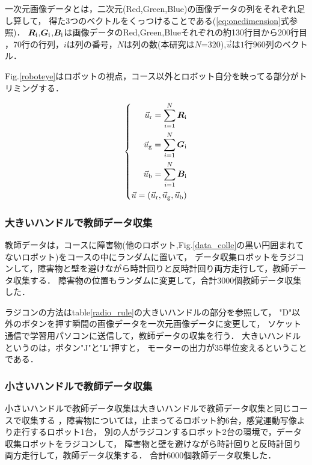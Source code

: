 
一次元画像データとは，二次元(Red,Green,Blue)の画像データの列をそれぞれ足し算して，
得た3つのベクトルをくっつけることである(\ref{eq:onedimension}式参照)．
$\boldsymbol R_{\rm i}$,$\boldsymbol G_{\rm i}$,$\boldsymbol B_{\rm i}$は画像データのRed,Green,Blueそれぞれの約130行目から200行目
，70行の行列，$i$は列の番号，$N$は列の数(本研究は$N$=320),$\vec u$は$1$行$960$列のベクトル．

Fig.\ref{roboteye}はロボットの視点，コース以外とロボット自分を映ってる部分がトリミングする．

\vspace{-2mm}
\begin{eqnarray}
\left\{
\begin{aligned}
\vec u_{\rm r}= \sum_{i=1}^N \boldsymbol R_{\rm i}\\
\vec u_{\rm g}= \sum_{i=1}^N \boldsymbol G_{\rm i}\\
\vec u_{\rm b}= \sum_{i=1}^N \boldsymbol B_{\rm i}\\
\vec u = (\vec u_{\rm r},\vec u_{\rm g},\vec u_{\rm b}) \\
\end{aligned}
\right.
\label{eq:onedimension}
\end{eqnarray}


\subsubsection{大きいハンドルで教師データ収集}
教師データは，コースに障害物(他のロボット,Fig.\ref{data_colle}の黒い円囲まれてないロボット)をコースの中にランダムに置いて，
データ収集ロボットをラジコンして，障害物と壁を避けながら時計回りと反時計回り両方走行して，教師データ収集する．
障害物の位置もランダムに変更して，合計3000個教師データ収集した．

ラジコンの方法はtable\ref{radio_rule}の大きいハンドルの部分を参照して，
"D"以外のボタンを押す瞬間の画像データを一次元画像データに変更して，
ソケット通信で学習用パソコンに送信して，教師データの収集を行う．
大きいハンドルというのは，ボタン"J"と"L"押すと，
モーターの出力が35単位変えるということである．
\subsubsection{小さいハンドルで教師データ収集}
小さいハンドルで教師データ収集は大きいハンドルで教師データ収集と同じコースで収集する
，障害物については，止まってるロボット約6台，感覚運動写像より走行するロボット1台，
別の人がラジコンするロボット2台の環境で，データ収集ロボットをラジコンして，
障害物と壁を避けながら時計回りと反時計回り両方走行して，教師データ収集する．
合計6000個教師データ収集した．

